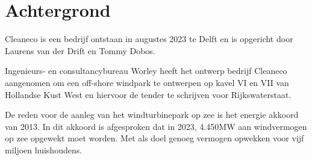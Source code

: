 \section{Achtergrond}
Cleaneco is een bedrijf ontstaan in augustes 2023 te Delft en is opgericht door Laurens van der Drift en Tommy Dobos.

Ingenieurs- en consultancybureau Worley heeft het ontwerp bedrijf Cleaneco aangenomen om een off-shore windpark te ontwerpen op kavel VI en VII van Hollandse Kust West en hiervoor de \gls{tender} te schrijven voor Rijkswaterstaat. 

De reden voor de aanleg van het windturbinepark op zee is het \gls{energie akkoord}\cite{energieakkoord} van 2013. In dit akkoord is afgesproken dat in 2023, 4.450MW aan windvermogen op zee opgewekt moet worden. Met als doel genoeg vermogen opwekken voor vijf miljoen huishoudens. 
